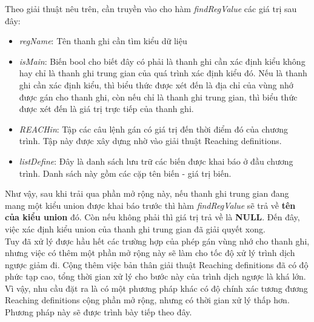 Theo giải thuật nêu trên, cần truyền vào cho hàm \textit{findRegValue} các giá trị sau đây:
\begin{itemize}
	\item \textit{regName}: Tên thanh ghi cần tìm kiểu dữ liệu
	\item \textit{isMain}: Biến bool cho biết đây có phải là thanh ghi cần xác định kiểu không hay chỉ là thanh ghi trung gian của quá trình xác định kiểu đó. Nếu là thanh ghi cần xác định kiểu, thì biểu thức được xét đến là địa chỉ của vùng nhớ được gán cho thanh ghi, còn nếu chỉ là thanh ghi trung gian, thì biểu thức được xét đến là giá trị trực tiếp của thanh ghi.
	\item \textit{REACHin}: Tập các câu lệnh gán có giá trị đến thời điểm đó của chương trình. Tập này được xây dựng nhờ vào giải thuật Reaching definitions.
	\item \textit{listDefine}: Đây là danh sách lưu trữ các biến được khai báo ở đầu chương trình. Danh sách này gồm các cặp tên biến - giá trị biến.
\end{itemize}

Như vậy, sau khi trải qua phần mở rộng này, nếu thanh ghi trung gian đang mang một kiểu union được khai báo trước thì hàm \textit{findRegValue} sẽ trả về \textbf{tên của kiểu union} đó. Còn nếu không phải thì giá trị trả về là \textbf{NULL}. Đến đây, việc xác định kiểu union của thanh ghi trung gian đã giải quyết xong.\\

Tuy đã xử lý được hầu hết các trường hợp của phép gán vùng nhớ cho thanh ghi, nhưng việc có thêm một phần mở rộng này sẽ làm cho tốc độ xử lý trình dịch ngược giảm đi. Cộng thêm việc bản thân giải thuật Reaching definitions đã có độ phức tạp cao, tổng thời gian xử lý cho bước này của trình dịch ngược là khá lớn. Vì vậy, nhu cầu đặt ra là có một phương pháp khác có độ chính xác tương đương Reaching definitions cộng phần mở rộng, nhưng có thời gian xử lý thấp hơn. Phương pháp này sẽ được trình bày tiếp theo đây.

